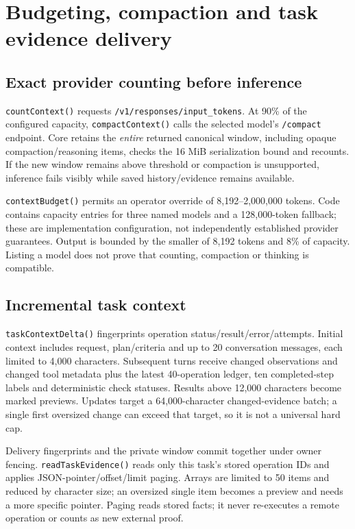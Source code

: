 \section{Budgeting, compaction and task evidence delivery}
\subsection{Exact provider counting before inference}
\texttt{countContext()} requests \texttt{/v1/responses/input\_tokens}. At 90\% of the configured capacity, \texttt{compactContext()} calls the selected model's \texttt{/compact} endpoint. Core retains the \emph{entire} returned canonical window, including opaque compaction/reasoning items, checks the 16 MiB serialization bound and recounts. If the new window remains above threshold or compaction is unsupported, inference fails visibly while saved history/evidence remains available.

\texttt{contextBudget()} permits an operator override of 8,192--2,000,000 tokens. Code contains capacity entries for three named models and a 128,000-token fallback; these are implementation configuration, not independently established provider guarantees. Output is bounded by the smaller of 8,192 tokens and 8\% of capacity. Listing a model does not prove that counting, compaction or thinking is compatible.
\subsection{Incremental task context}
\texttt{taskContextDelta()} fingerprints operation status/result/error/attempts. Initial context includes request, plan/criteria and up to 20 conversation messages, each limited to 4,000 characters. Subsequent turns receive changed observations and changed tool metadata plus the latest 40-operation ledger, ten completed-step labels and deterministic check statuses. Results above 12,000 characters become marked previews. Updates target a 64,000-character changed-evidence batch; a single first oversized change can exceed that target, so it is not a universal hard cap.

Delivery fingerprints and the private window commit together under owner fencing. \texttt{readTaskEvidence()} reads only this task's stored operation IDs and applies JSON-pointer/offset/limit paging. Arrays are limited to 50 items and reduced by character size; an oversized single item becomes a preview and needs a more specific pointer. Paging reads stored facts; it never re-executes a remote operation or counts as new external proof.
